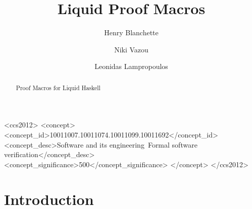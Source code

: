 \documentclass[sigplan,screen]{acmart}
\begin{document}
\title{Liquid Proof Macros}

\author{Henry Blanchette}

\author{Niki Vazou}

\author{Leonidas Lampropoulos}

\renewcommand{\shortauthors}{Blanchette et al.}

\begin{abstract}
  Proof Macros for Liquid Haskell
\end{abstract}

\begin{CCSXML}
<ccs2012>
   <concept>
       <concept_id>10011007.10011074.10011099.10011692</concept_id>
       <concept_desc>Software and its engineering~Formal software verification</concept_desc>
       <concept_significance>500</concept_significance>
       </concept>
 </ccs2012>
\end{CCSXML}



\maketitle

\section{Introduction}
\end{document}
